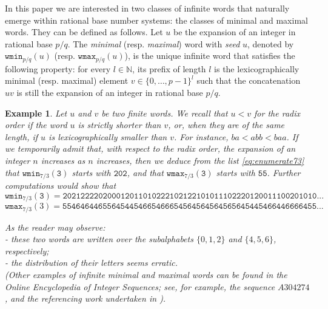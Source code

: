 \documentclass{template_arxiv}
\newtheorem{example}[theorem]{Example}
\numberwithin{equation}{section}
\newcommand{\N}{\mathbb N}
\newcommand{\wmax}{\mathtt{wmax}}
\newcommand{\wmin}{\mathtt{wmin}}
\begin{document}






In this paper we are interested in two classes of infinite words that naturally emerge within rational base number systems: the classes of minimal and maximal words. They can be defined as follows. Let $u$ be the expansion of an integer in rational base $p/q$. The \emph{minimal} (resp. \emph{maximal}) word with \emph{seed} $u$, denoted by $\wmin_{p/q}(u)$ (resp. $\wmax_{p/q}(u)$), is the unique infinite word that satisfies the following property: for every $l \in \N$, its prefix of length $l$ is the lexicographically minimal (resp. maximal) element $v \in \{0,\ldots,p-1\}^l$ such that the concatenation $uv$ is still the expansion of an integer in rational base $p/q$.


\begin{example}\label{ex:infinite_wmin}
Let $u$ and $v$ be two finite words. We recall that $u<v$ for the \emph{radix order} if the word $u$ is strictly shorter than $v$, or, when they are of the same length, if $u$ is lexicographically smaller than $v$. For instance, $ba<abb<baa$. If we temporarily admit that, with respect to the radix order, the expansion of an integer $n$ increases as $n$ increases, then we deduce from the list \eqref{eq:enumerate73} that $\wmin_{7/3}(\mathtt{3})$ starts with $\mathtt{202}$, and that $\wmax_{7/3}(\mathtt{3})$ starts with $\mathtt{55}$. Further computations would show that
	\[
	\wmin_{7/3}(\mathtt{3})=
	\mathtt{202122220200012011010222102122101011102220120011100201010...}%
	\]
	\[
	\wmax_{7/3}(3)=
	\mathtt{554646446556454454665466654564564564565645445466446666455...}%
	\]

As the reader may observe:\\
- these two words are written over the subalphabets $\{0,1,2\}$ and $\{4,5,6\}$, respectively; \\
- the distribution of their letters seems erratic.\\
(Other examples of infinite minimal and maximal words can be found in the Online Encyclopedia of Integer Sequences; see, for example, the sequence $A304274$, and the referencing work undertaken in \cite{Stu18}).
\end{example}
\end{document}
